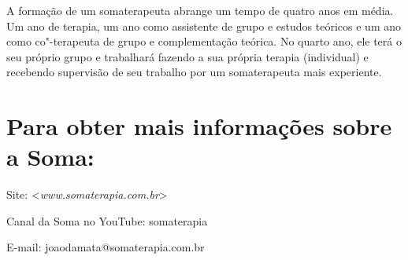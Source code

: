A formação de um somaterapeuta abrange um tempo de quatro anos em média.
Um ano de terapia, um ano como assistente de grupo e estudos teóricos e
um ano como co"-terapeuta de grupo e complementação teórica. No quarto
ano, ele terá o seu próprio grupo e trabalhará fazendo a sua própria
terapia (individual) e recebendo supervisão de seu trabalho por um
somaterapeuta mais experiente.

\section*{Para obter mais informações sobre a Soma:}

Site:
\textless{}\emph{www.somaterapia.com.br}\textgreater{}

Canal da Soma no YouTube: somaterapia

E-mail: joaodamata@somaterapia.com.br
